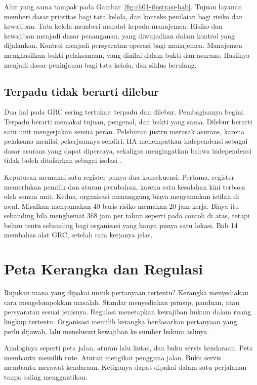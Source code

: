 Alur yang sama tampak pada Gambar~\ref{fig:ch01-ilustrasi-bab}. Tujuan layanan memberi dasar
prioritas bagi tata kelola, dan konteks penilaian bagi risiko dan kewajiban. Tata kelola
memberi mandat kepada manajemen. Risiko dan kewajiban menjadi dasar penanganan, yang
diwujudkan dalam kontrol yang dijalankan. Kontrol menjadi persyaratan operasi bagi
manajemen. Manajemen menghasilkan bukti pelaksanaan, yang dinilai dalam bukti dan asurans.
Hasilnya menjadi dasar peninjauan bagi tata kelola, dan siklus berulang.

\subsection*{Terpadu tidak berarti dilebur}

Dua hal pada GRC sering tertukar: terpadu dan dilebur. Pembagiannya begini. Terpadu berarti
memakai tujuan, pengenal, dan bukti yang sama. Dilebur berarti satu unit mengerjakan semua
peran. Peleburan justru merusak asurans, karena pelaksana menilai pekerjaannya sendiri. IIA
menempatkan independensi sebagai dasar asurans yang dapat dipercaya, sekaligus mengingatkan
bahwa independensi tidak boleh ditafsirkan sebagai isolasi \cite{iia-tlm2026}.

Keputusan memakai satu register punya dua konsekuensi. Pertama, register memerlukan pemilik
dan aturan perubahan, karena satu kesalahan kini terbaca oleh semua unit. Kedua, organisasi
menanggung biaya menyamakan istilah di awal. Misalkan menyamakan 40 baris risiko memakan
20 jam kerja. Biaya itu sebanding bila menghemat 368 jam per tahun seperti pada contoh di
atas, tetapi belum tentu sebanding bagi organisasi yang hanya punya satu lokasi. Bab 14
membahas alat GRC, setelah cara kerjanya jelas.

\section{Peta Kerangka dan Regulasi}

Rujukan mana yang dipakai untuk pertanyaan tertentu? Kerangka menyediakan cara
mengelompokkan masalah. Standar menyediakan prinsip, panduan,
atau persyaratan sesuai jenisnya. Regulasi menetapkan kewajiban hukum dalam ruang lingkup
tertentu. Organisasi memilih kerangka berdasarkan pertanyaan yang perlu dijawab, lalu
menelusuri kewajiban ke sumber hukum aslinya.

Analoginya seperti peta jalan, aturan lalu lintas, dan buku servis kendaraan. Peta membantu
memilih rute. Aturan mengikat pengguna jalan. Buku servis membantu merawat kendaraan.
Ketiganya dapat dipakai dalam satu perjalanan tanpa saling menggantikan.


